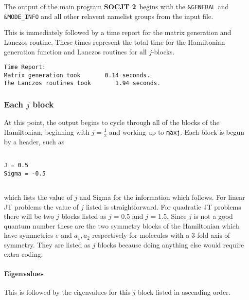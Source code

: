 \documentclass{article}
\newcommand{\JT}{Jahn-Teller\ }
\newcommand{\socjttwo}{{\bf SOCJT 2}}
\begin{document}
The output of the main program \socjttwo\ begins with the {\tt \&GENERAL} and {\tt \&MODE\_INFO} and all other relavent namelist groups
from the input file. 

This is immediately followed by a time report for the matrix generation and Lanczos routine. These times represent the total time for the Hamiltonian generation function and Lanczos routines for all $j$-blocks.

\begin{verbatim}
Time Report:
Matrix generation took       0.14 seconds.
The Lanczos routines took       1.94 seconds.
\end{verbatim}





\subsubsection{Each $j$ block}

At this point, the output begins to cycle through all of the blocks of
the Hamiltonian, beginning with $j=\frac{1}{2} $ and working up to
{\tt maxj}. Each block is begun by a header, such as
\begin{verbatim}
 
J = 0.5
Sigma = -0.5
 
\end{verbatim}

which lists the value of $j$ and Sigma for the information which follows. For linear JT problems the value of $j$ listed is straightforward. For quadratic JT problems there will be two $j$ blocks listed as $j$ = 0.5 and $j$ = 1.5. Since $j$ is not a good quantum number these are the two symmetry blocks of the Hamiltonian which have symmetries $e$ and $a_1, a_2$ respectively for molecules with a 3-fold axis of symmetry. They are listed as $j$ blocks because doing anything else would require extra coding.

\paragraph{Eigenvalues}
This is followed by the eigenvalues for this $j$-block listed in ascending order.
\end{document}
